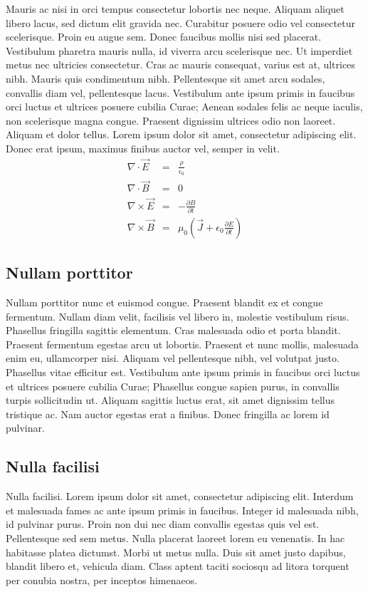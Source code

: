 \documentclass[11pt,oneside,openright]{book}
\begin{document}
Mauris ac nisi in orci tempus consectetur lobortis nec neque. Aliquam aliquet libero lacus, sed dictum elit gravida nec. Curabitur posuere odio vel consectetur scelerisque. Proin eu augue sem. Donec faucibus mollis nisi sed placerat. Vestibulum pharetra mauris nulla, id viverra arcu scelerisque nec. Ut imperdiet metus nec ultricies consectetur. Cras ac mauris consequat, varius est at, ultrices nibh. Mauris quis condimentum nibh. Pellentesque sit amet arcu sodales, convallis diam vel, pellentesque lacus. Vestibulum ante ipsum primis in faucibus orci luctus et ultrices posuere cubilia Curae; Aenean sodales felis ac neque iaculis, non scelerisque magna congue. Praesent dignissim ultrices odio non laoreet. Aliquam et dolor tellus. Lorem ipsum dolor sit amet, consectetur adipiscing elit. Donec erat ipsum, maximus finibus auctor vel, semper in velit.
\begin{eqnarray}
\nabla\cdot\vec{E} &=& \frac{\rho}{\epsilon_0} \\
\nabla\cdot\vec{B} &=& 0 \\
\nabla\times\vec{E} &=& -\frac{\partial B}{\partial t} \\
\nabla\times\vec{B} &=& \mu_0\left(\vec{J}+\epsilon_0\frac{\partial E}{\partial t} \right)
\end{eqnarray}


\subsection{Nullam porttitor}

Nullam porttitor nunc et euismod congue. Praesent blandit ex et congue fermentum. Nullam diam velit, facilisis vel libero in, molestie vestibulum risus. Phasellus fringilla sagittis elementum. Cras malesuada odio et porta blandit. Praesent fermentum egestas arcu ut lobortis. Praesent et nunc mollis, malesuada enim eu, ullamcorper nisi. Aliquam vel pellentesque nibh, vel volutpat justo. Phasellus vitae efficitur est. Vestibulum ante ipsum primis in faucibus orci luctus et ultrices posuere cubilia Curae; Phasellus congue sapien purus, in convallis turpis sollicitudin ut. Aliquam sagittis luctus erat, sit amet dignissim tellus tristique ac. Nam auctor egestas erat a finibus. Donec fringilla ac lorem id pulvinar.

\subsection{Nulla facilisi}

Nulla facilisi. Lorem ipsum dolor sit amet, consectetur adipiscing elit. Interdum et malesuada fames ac ante ipsum primis in faucibus. Integer id malesuada nibh, id pulvinar purus. Proin non dui nec diam convallis egestas quis vel est. Pellentesque sed sem metus. Nulla placerat laoreet lorem eu venenatis. In hac habitasse platea dictumst. Morbi ut metus nulla. Duis sit amet justo dapibus, blandit libero et, vehicula diam. Class aptent taciti sociosqu ad litora torquent per conubia nostra, per inceptos himenaeos.
\end{document}
